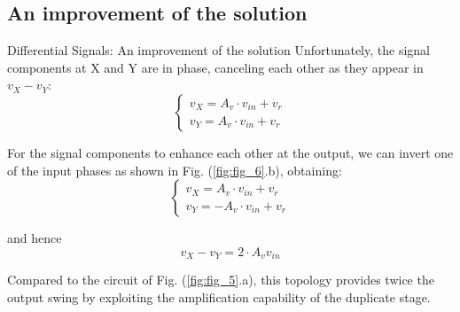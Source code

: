 \documentclass[10pt]{beamer}
\begin{document}
\subsection{An improvement of the solution}
\begin{frame}{Differential Signals: An improvement of the solution}
    Unfortunately, the signal components at X and Y are in phase, canceling each other as
    they appear in $v_{X} - v_{Y}$:
    \begin{equation}
        \begin{cases}
            v_{X} = A_{v} \cdot v_{in} + v_{r} \\
            v_{Y} = A_{v} \cdot v_{in} + v_{r}
        \end{cases}
        \label{eq_4}
    \end{equation}
    
    For the signal components to enhance each other at the output, we can invert one of
    the input phases as shown in Fig. (\ref{fig:fig_6}.b), obtaining:
    \begin{equation}
        \begin{cases}
            v_{X} = A_{v} \cdot v_{in} + v_{r} \\
            v_{Y} = - A_{v} \cdot v_{in} + v_{r}
        \end{cases}
        \label{eq_5}
    \end{equation}
    
    and hence
    \begin{equation}
        v_{X} - v_{Y} = 2 \cdot A_{v} v_{in}
        \label{eq_6}
    \end{equation}
    
    Compared to the circuit of Fig. (\ref{fig:fig_5}.a), this topology provides twice the output swing by exploiting the amplification capability of the duplicate stage.
\end{frame}
\end{document}
